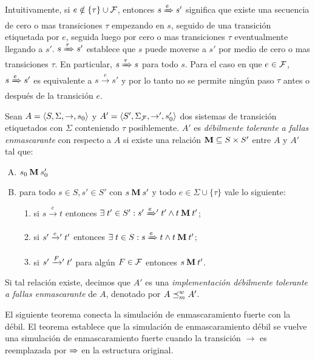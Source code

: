 Intuitivamente, si $e \notin \{\tau\}\cup\mathcal{F}$, entonces $s\xRightarrow{e}s'$ significa que existe una secuencia de cero o mas transiciones $\tau$ empezando en $s$, seguido de una transición etiquetada por $e$, seguida luego por cero o mas transiciones $\tau$ eventualmente llegando a  $s'$.
$s \xRightarrow{\tau} s'$ establece que $s$ puede moverse a $s'$ por medio de cero o mas transiciones $\tau$.
%
En particular, $s \xRightarrow{\tau} s$ para todo $s$.
%
Para el caso en que $e\in\mathcal{F}$,
$s\xRightarrow{e}s'$ es equivalente a $s\xrightarrow{e}s'$ y por lo tanto no se permite ningún paso $\tau$ antes o después de la transición $e$.

\begin{definition} \label{def:weak_mask}
  Sean $A =\langle S, \Sigma, \rightarrow, s_0 \rangle$ y $A' =\langle S',
  \Sigma_{\mathcal{F}}, \rightarrow', s'_0 \rangle$ dos sistemas de transición etiquetados con $\Sigma$
  conteniendo $\tau$ posiblemente.  $A'$ es \emph{débilmente tolerante a fallas enmascarante}
  con respecto a $A$ si existe una relación $\mathbin{\mathbf{M}} \subseteq S
  \times S'$ entre $A$ y $A'$ tal que:

\begin{enumerate}[(A)]
  \item $s_0 \mathbin{\mathbf{M}} s'_0$
  \item para todo $s \in S, s' \in S'$ con $s \mathbin{\mathbf{M}} s'$ y todo $e \in \Sigma \cup \{\tau\}$ vale lo siguiente:

  \begin{enumerate}[(1)]
    \item si $s \xrightarrow{e} t$ entonces 
    $\exists\; t' \in S': s' \mathrel{{\xRightarrow[]{e}}{}'} t' 
    \wedge t \mathbin{\mathbf{M}} t'$;

      \item si $s' \mathrel{{\xrightarrow[]{e}}{}'} t'$ entonces  
      $\exists \; t \in S: s \xRightarrow{e} t  
      \wedge t \mathbin{\mathbf{M}} t'$;

      \item si $s' \mathrel{{\xrightarrow[]{F}}{}'} t'$ para algún $F \in \mathcal{F}$ entonces 
      $s \mathbin{\mathbf{M}} t'$.
  \end{enumerate}
\end{enumerate}

%
Si tal relación existe, decimos que $A'$ es una \emph{implementación débilmente tolerante a fallas enmascarante} de
$A$, denotado por $A \preceq^w_{m} A'$.
\end{definition}

El siguiente teorema conecta la simulación de enmascaramiento fuerte con la débil. El teorema establece que la simulación de enmascaramiento débil se vuelve una simulación de enmascaramiento fuerte cuando la transición $\xrightarrow{}$ es reemplazada por $\xRightarrow{}$ en la estructura original.


